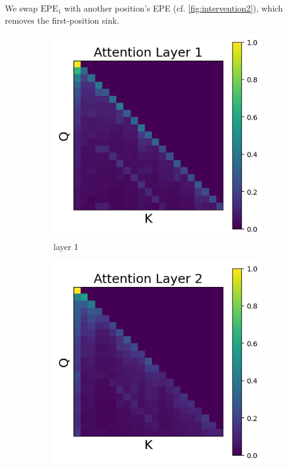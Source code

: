\documentclass[11pt]{article}
\begin{document}
We swap $\mathrm{EPE}_1$ with another position’s EPE (cf. \cref{fig:intervention2}), which removes the first-position sink.
\begin{figure}[t]
  \begin{subfigure}[t]{0.24\textwidth}
    \centering
    \includegraphics[width=1.4\columnwidth]{figures/intervention2/layer_1.png}
    \caption{layer 1}
  \end{subfigure}\hfill
  \begin{subfigure}[t]{0.24\textwidth}
    \centering
    \includegraphics[width=1.4\columnwidth]{figures/intervention2/layer_2.png}

\end{subfigure}
\end{figure}
\end{document}
